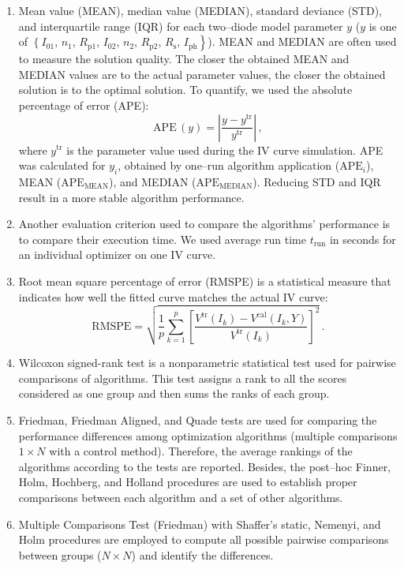 \documentclass[a4paper,fleqn]{cas-sc}
\begin{document}
\begin{enumerate}[1.]
\item
Mean value (MEAN), median value (MEDIAN), standard deviance (STD), and interquartile range (IQR)
for each two--diode model parameter $y$
($y$ is one of $\left\{I_{01}\right.$, $n_1$, $R_\mathrm{p1}$, $I_{02}$, $n_2$, $R_\mathrm{p2}$, $R_\mathrm{s}$, $\left.I_\mathrm{ph}\right\}$).
MEAN and MEDIAN are often used to measure the solution quality.
The closer the obtained MEAN and MEDIAN values are to the actual parameter values,
the closer the obtained solution is to the optimal solution.
To quantify, we used the  absolute percentage of error (APE):
\begin{equation}
\label{eqAPE}
\mathrm{APE}\,(y)= \left| \frac{y-y^\mathrm{tr}}{y^\mathrm{tr}}\right|\,,
\end{equation}
where
$y^\mathrm{tr}$ is the parameter value used during the IV curve simulation.
APE was calculated for $y_i$, obtained by one--run algorithm application ($\mathrm{APE}_i$),
MEAN ($\mathrm{APE}_\mathrm{MEAN}$), and MEDIAN ($\mathrm{APE}_\mathrm{MEDIAN}$).
Reducing STD and IQR result in a more stable algorithm performance.

\item
Another evaluation criterion used to compare the algorithms’ performance is to compare their execution time.
We used average run time $t_\mathrm{run}$ in seconds for an
individual optimizer on one IV curve.

\item
Root mean square percentage of error (RMSPE) is a statistical measure that indicates
how well the fitted curve matches the actual IV curve:
\begin{equation}
\label{eqRMSPE}
\mathrm{RMSPE}= \sqrt{\frac{1}{p} \sum_{k=1}^p \left[\frac{V^\mathrm{tr}(I_k)-V^\mathrm{cal}(I_k,Y)}{V^\mathrm{tr}(I_k)} \right]^2}\,.
\end{equation}

\item
Wilcoxon signed-rank test is a nonparametric statistical test used for pairwise comparisons of algorithms.
This test assigns a rank to all the scores considered as one group and then sums the ranks of each group.

\item
Friedman, Friedman Aligned, and Quade tests are used for comparing the performance differences
among optimization algorithms
(multiple comparisons $1\times N$ with a control method).
Therefore, the average rankings of the algorithms according to the
tests are reported.
Besides, the post--hoc  Finner, Holm, Hochberg, and Holland procedures
are used to establish proper comparisons between each algorithm and a set of other algorithms.

\item
Multiple Comparisons Test (Friedman) with Shaffer’s static, Nemenyi, and Holm procedures
are employed to compute all possible pairwise comparisons between groups ($N\times N$)
and identify the differences.

\end{enumerate}
\end{document}
